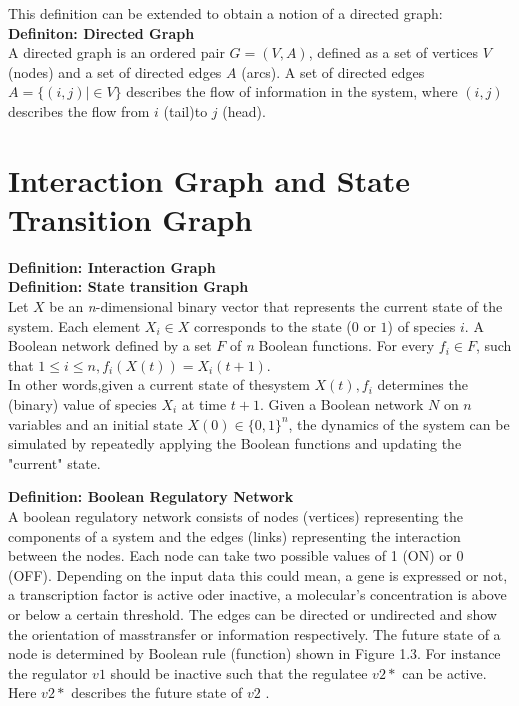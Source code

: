 This definition can be extended to obtain a notion of a directed graph:\\

\textbf{Definiton: Directed Graph}\\
A directed graph is an ordered pair $G=(V,A)$, defined as a set of vertices $V$ (nodes) and a set of directed edges $A$ (arcs). A set of directed edges $A=\{ (i,j)|\in V\} $ describes the flow of information in the system, where $(i,j)$ describes the flow from $i$ (tail)to $j$ (head). 



\section{Interaction Graph and State Transition Graph}


\textbf{Definition: Interaction Graph}\\

\textbf{Definition: State transition Graph}\\
Let $X$ be an \textit{n}-dimensional binary vector that represents the current state of the system. Each element $X_i\in X$ corresponds to the state ($0$ or $1$) of species $i$. A Boolean network defined by a set $F$ of \textit{n} Boolean functions. For every $f_i\in F$, such that $1\leq i\leq n,f_i(X(t))=X_i(t+1)$.\\ 

In other words,given a current state of thesystem $X(t),f_i$ determines the (binary) value of species $X_i$ at time $t+1$. Given a Boolean network $N$ on $n$ variables and an initial state $X(0)\in \lbrace 0,1\rbrace ^n$, the dynamics of the system can be simulated by repeatedly applying the Boolean functions and updating the "current" state.

\textbf{Definition: Boolean Regulatory Network}\\


\citep{10.1371/journal.pone.0066031}%
A boolean regulatory network consists of nodes (vertices) representing the components of a system and the edges (links) representing  the interaction between the nodes. Each node can take two possible values of 1 (ON) or 0 (OFF). Depending on the input data this could mean, a gene is expressed or not, a transcription factor is active oder inactive, a molecular's concentration is above or below a certain threshold. The edges can be directed or undirected and show the orientation of masstransfer or information respectively. The future state of a node is determined by Boolean rule (function) shown in Figure 1.3. For instance the regulator $v1$ should be inactive such that the regulatee $v2*$ can be active. Here $v2*$ describes the future state of $v2$ \citep{SAADATPOUR20133}. 

